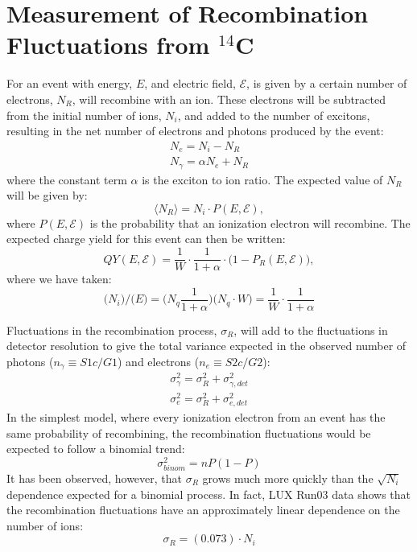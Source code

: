 \section{Measurement of Recombination Fluctuations from $^{14}$C}
For an event with energy, $E$, and electric field, $\mathcal{E}$, is given by a certain number of electrons, $N_R$, will recombine with an ion. These electrons will be subtracted from the initial number of ions, $N_{i}$, and added to the number of excitons, resulting in the net number of electrons and photons produced by the event:
\begin{equation} 
\begin{split}
N_e=N_i-N_R \\
N_{\gamma}=\alpha N_e+N_R
\end{split}
\end{equation}
where the constant term $\alpha$  is the exciton to ion ratio. The expected value of $N_R$ will be given by:
\begin{equation}
\langle N_R \rangle = N_i\cdot P(E,\mathcal{E}),
\end{equation}
where $P(E,\mathcal{E})$ is the probability that an ionization electron will recombine. The expected charge yield for this event can then be written:
\begin{equation}
QY(E,\mathcal{E})=\frac{1}{W} \cdot \frac{1}{1+\alpha} \cdot \bigg(1-P_R(E,\mathcal{E})\bigg),
\end{equation}
where we have taken:
\begin{equation}
\Big(N_i\Big)/\Big(E\Big)=\Big( N_q\frac{1}{1+\alpha} \Big)\Big(N_q\cdot W\Big)= \frac{1}{W} \cdot \frac{1}{1+\alpha}
\end{equation}

Fluctuations in the recombination process, $\sigma_R$, will add to the fluctuations in detector resolution to give the total variance expected in the observed number of photons ($n_{\gamma}\equiv S1c/G1$) and electrons ($n_{e}\equiv S2c/G2$):
\begin{equation}\label{eq:detres_rec}
\begin{split}
\sigma_{\gamma}^2=\sigma_{R}^2+\sigma_{\gamma,det}^2\\[1em]
\sigma_{e}^2=\sigma_{R}^2+\sigma_{e,det}^2
\end{split}
\end{equation}
In the simplest model, where every ionization electron from an event has the same probability of recombining, the recombination fluctuations would be expected to follow a binomial trend:
\begin{equation}
\sigma_{binom}^2=nP(1-P)
\end{equation}
It has been observed, however, that $\sigma_R$ grows much more quickly than the $\sqrt{N_i}$ dependence expected for a binomial process. In fact, LUX Run03 data shows that the recombination fluctuations have an approximately linear dependence on the number of ions\cite{lux_tritium}:
\begin{equation}
\sigma_R=(0.073)\cdot N_i
\end{equation}



